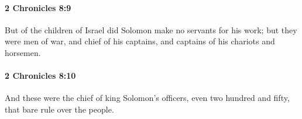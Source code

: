 		\paragraph{2 Chronicles 8:9} %
			\label{2CHRONICLES-8-9}

			But of the children of Israel did Solomon make no servants for his work; but they were men of war, and chief of his captains, and captains of his chariots and horsemen.


		\paragraph{2 Chronicles 8:10} %
			\label{2CHRONICLES-8-10}

			And these were the chief of king Solomon's officers, even two hundred and fifty, that bare rule over the people.


